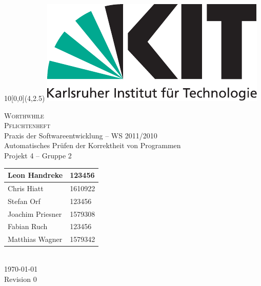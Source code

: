 
\newcommand{\diameter}{20}
\newcommand{\xone}{-15}
\newcommand{\xtwo}{160}
\newcommand{\yone}{15}
\newcommand{\ytwo}{-253}

\begin{titlepage}
	\begin{textblock}{10}[0,0](4,2.5)
		\includegraphics[width=.3\textwidth]{images/kit_logo_de_4c_positiv.pdf}
	\end{textblock}
	\vspace*{3.5cm}
	\begin{center}
		\fontsize{45}{50}\selectfont
  \textsc{Worthwhile} \\
  \textsc{Pflichtenheft}
		\vspace*{2cm}\\
		\LARGE
  Praxis der Softwareentwicklung -- WS 2011/2010 \\
  Automatisches Prüfen der Korrektheit von Programmen \\
  Projekt 4 -- Gruppe 2 \\
  \medskip
  \vspace*{2cm}
  \Large
  \begin{tabular}{|l|l|}
    \hline
    Leon Handreke & 123456 \\
    \hline
    Chris Hiatt & 1610922 \\
    \hline
    Stefan Orf & 123456 \\
    \hline
    Joachim Priesner & 1579308 \\
    \hline
    Fabian Ruch & 123456 \\
    \hline
    Matthias Wagner & 1579342 \\
    \hline
  \end{tabular}
  \vspace*{2cm} \\
  \today \\
	Revision 0
	\end{center}
	\vspace*{1cm}


\end{titlepage}
